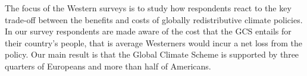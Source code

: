 
The focus of the Western surveys is to study how respondents react to the key trade-off between the benefits and costs of globally redistributive climate policies. In our survey respondents are made aware of the cost that the GCS entails for their country's people, that is average Westerners would incur a net loss from the policy. Our main result is that the Global Climate Scheme %
is supported by three quarters of Europeans and more than half of Americans. 

